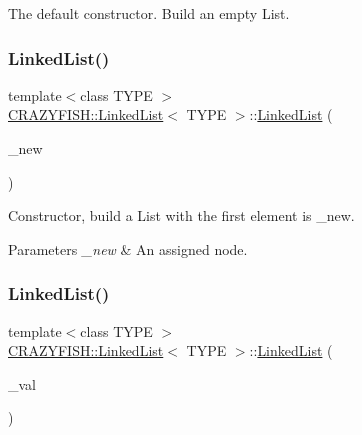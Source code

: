 The default constructor. Build an empty List. \mbox{\label{classCRAZYFISH_1_1LinkedList_a97ff37e22764e437dfeff71c686cfbd0}} 
\subsubsection{\texorpdfstring{Linked\+List()}{LinkedList()}\hspace{0.1cm}{\footnotesize\ttfamily [2/3]}}
{\footnotesize\ttfamily template$<$class T\+Y\+PE $>$ \\
\hyperlink{classCRAZYFISH_1_1LinkedList}{C\+R\+A\+Z\+Y\+F\+I\+S\+H\+::\+Linked\+List}$<$ T\+Y\+PE $>$\+::\hyperlink{classCRAZYFISH_1_1LinkedList}{Linked\+List} (\begin{DoxyParamCaption}\item[{\hyperlink{classCRAZYFISH_1_1LinkedList_1_1Node}{Node} \&}]{\+\_\+new }\end{DoxyParamCaption})}

Constructor, build a List with the first element is \+\_\+new.


\begin{DoxyParams}{Parameters}
{\em \+\_\+new} & An assigned node. \\
\hline
\end{DoxyParams}
\mbox{\label{classCRAZYFISH_1_1LinkedList_a5d084245dc02a983ba9645c80fc14cea}} 
\subsubsection{\texorpdfstring{Linked\+List()}{LinkedList()}\hspace{0.1cm}{\footnotesize\ttfamily [3/3]}}
{\footnotesize\ttfamily template$<$class T\+Y\+PE $>$ \\
\hyperlink{classCRAZYFISH_1_1LinkedList}{C\+R\+A\+Z\+Y\+F\+I\+S\+H\+::\+Linked\+List}$<$ T\+Y\+PE $>$\+::\hyperlink{classCRAZYFISH_1_1LinkedList}{Linked\+List} (\begin{DoxyParamCaption}\item[{T\+Y\+PE \&}]{\+\_\+val }\end{DoxyParamCaption})}

